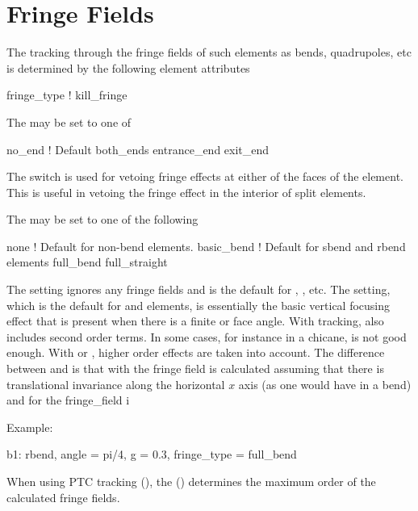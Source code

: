 \section{Fringe Fields}
\label{s:fringe}

The tracking through the fringe fields of such elements as bends,
quadrupoles, etc is determined by the following element attributes
\begin{example}
  fringe_type    !  
  kill_fringe
\end{example}

The  may be set to one of
\begin{example}
  no_end               ! Default
  both_ends
  entrance_end
  exit_end
\end{example}
The  switch is used for vetoing fringe effects at
either of the faces of the element. This is useful in vetoing the
fringe effect in the interior of split elements.

The  may be set to one of the following
\begin{example}
  none              ! Default for non-bend elements.
  basic_bend        ! Default for sbend and rbend elements
  full_bend
  full_straight
\end{example}
The  setting ignores any fringe fields and is the default for
, , etc. The  setting,
which is the default for  and  elements, is
essentially the basic vertical focusing effect that is present when
there is a finite  or  face angle. With
 tracking,  also includes second
order terms.  In some cases, for instance in a chicane,
 is not good enough. With  or
, higher order effects are taken into account.  The
difference between  and  is that with
 the fringe field is calculated assuming that there is
translational invariance along the horizontal $x$ axis (as one would have 
in a bend) and for  the fringe_field i

Example:
\begin{example}
  b1: rbend, angle = pi/4, g = 0.3, fringe_type = full_bend
\end{example}

When using PTC tracking (), the
 () determines the maximum
order of the calculated fringe fields.

